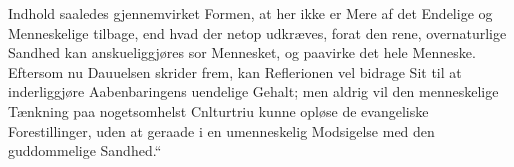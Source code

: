 \documentclass[12pt,a4paper]{book}
\begin{document}
Indhold saaledes gjennemvirket Formen, at her ikke er Mere af det Endelige og
Menneskelige tilbage, end hvad der netop udkræves, forat den rene, overnaturlige Sandhed
kan anskueliggjøres sor Mennesket, og paavirke det hele Menneske. Eftersom nu Dauuelsen
skrider frem, kan Reflerionen vel bidrage Sit til at inderliggjøre Aabenbaringens
uendelige Gehalt; men aldrig vil den menneskelige Tænkning paa nogetsomhelst Cnlturtriu
kunne opløse de evangeliske Forestillinger, uden at geraade i en umenneskelig Modsigelse
med den guddommelige Sandhed.“
\end{document}
